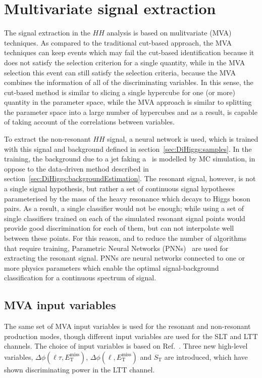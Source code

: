 \section{Multivariate signal extraction}
\label{sec:DiHiggs:MVA}
The signal extraction in the $HH$ analysis is based on mulitvariate (MVA) techniques.
As compared to the traditional cut-based approach, the MVA techniques can keep events
which may fail the cut-based identification because it does not satisfy 
the selection criterion for a single quantity, 
while in the MVA selection this event can
still satisfy the selection criteria, 
because the MVA combines the information of all of the discriminating variables.
In this sense, the cut-based method is similar to slicing a single hypercube for
one (or more) quantity in the parameter space, while the MVA approach is similar to
splitting the parameter space into a large number of hypercubes and 
as a result, is capable of taking account of the correlations between variables.


To extract the non-resonant $HH$ signal, a neural network is used, 
which is trained with this signal and background defined 
in section~\ref{sec:DiHiggs:samples}. In the training, 
the background due to a jet faking a \tauhad\ is modelled 
by MC simulation, in oppose to the data-driven method described
in section~\ref{sec:DiHiggs:backgroundEstimation}.
The resonant signal, however, is not a single signal hypothesis, 
but rather a set of continuous signal hypotheses parameterised by 
the mass of the heavy resonance which decays to Higgs boson pairs.
As a result, a single classifier would not be enough;
while using a set of single classifiers trained on 
each of the simulated resonant signal points 
would provide good discrimination for each of them, 
but can not interpolate well between these points.
For this reason, and to reduce the number of algorithms 
that require training, 
Parametric Neural Networks (PNNs)~\cite{Baldi:2016fzo} are used  
for extracting the resonant signal. 
PNNs are neural networks connected to one or more physics parameters
which enable the optimal signal-background classification
for a continuous spectrum of signal. 

\subsection{MVA input variables}
The same set of MVA input variables is used for the resonant and non-resonant production modes, 
though different input variables are used for the SLT and LTT channels.
The choice of input variables is based on Ref.~\cite{HIGG-2016-16}.
Three new high-level variables, $\Delta\phi(\ell\tau, E_\text{T}^\text{miss})$,
$\Delta\phi(\ell, E_\text{T}^\text{miss})$ and 
$S_\text{T}$ are introduced, which have shown 
discriminating power in the LTT channel. 

